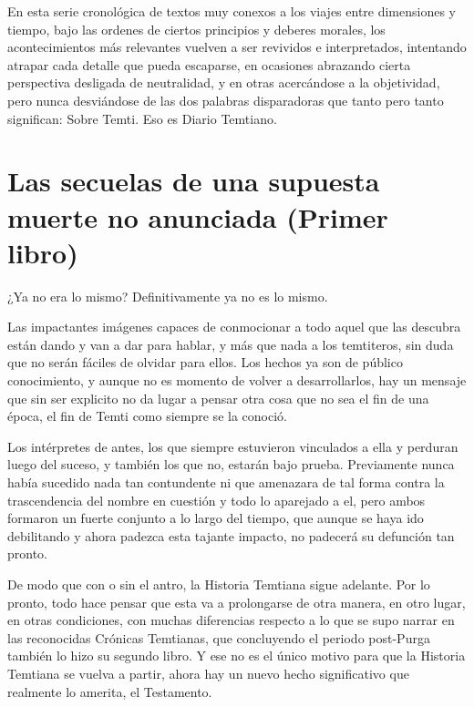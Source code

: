 \documentclass[
  spanish,
]{book}
\begin{document}
En esta serie cronológica de textos muy conexos a los viajes entre dimensiones y tiempo, bajo las ordenes de ciertos principios y deberes morales, los acontecimientos más relevantes vuelven a ser revividos e interpretados, intentando atrapar cada detalle que pueda escaparse, en ocasiones abrazando cierta perspectiva desligada de neutralidad, y en otras acercándose a la objetividad, pero nunca desviándose de las dos palabras disparadoras que tanto pero tanto significan: Sobre Temti. Eso es Diario Temtiano.

\hypertarget{las-secuelas-de-una-supuesta-muerte-no-anunciada-primer-libro}{%
\chapter{Las secuelas de una supuesta muerte no anunciada (Primer libro)}\label{las-secuelas-de-una-supuesta-muerte-no-anunciada-primer-libro}}

¿Ya no era lo mismo? Definitivamente ya no es lo mismo.

Las impactantes imágenes capaces de conmocionar a todo aquel que las descubra están dando y van a dar para hablar, y más que nada a los temtiteros, sin duda que no serán fáciles de olvidar para ellos. Los hechos ya son de público conocimiento, y aunque no es momento de volver a desarrollarlos, hay un mensaje que sin ser explicito no da lugar a pensar otra cosa que no sea el fin de una época, el fin de Temti como siempre se la conoció.

Los intérpretes de antes, los que siempre estuvieron vinculados a ella y perduran luego del suceso, y también los que no, estarán bajo prueba. Previamente nunca había sucedido nada tan contundente ni que amenazara de tal forma contra la trascendencia del nombre en cuestión y todo lo aparejado a el, pero ambos formaron un fuerte conjunto a lo largo del tiempo, que aunque se haya ido debilitando y ahora padezca esta tajante impacto, no padecerá su defunción tan pronto.

De modo que con o sin el antro, la Historia Temtiana sigue adelante. Por lo pronto, todo hace pensar que esta va a prolongarse de otra manera, en otro lugar, en otras condiciones, con muchas diferencias respecto a lo que se supo narrar en las reconocidas Crónicas Temtianas, que concluyendo el periodo post-Purga también lo hizo su segundo libro. Y ese no es el único motivo para que la Historia Temtiana se vuelva a partir, ahora hay un nuevo hecho significativo que realmente lo amerita, el Testamento.
\end{document}
